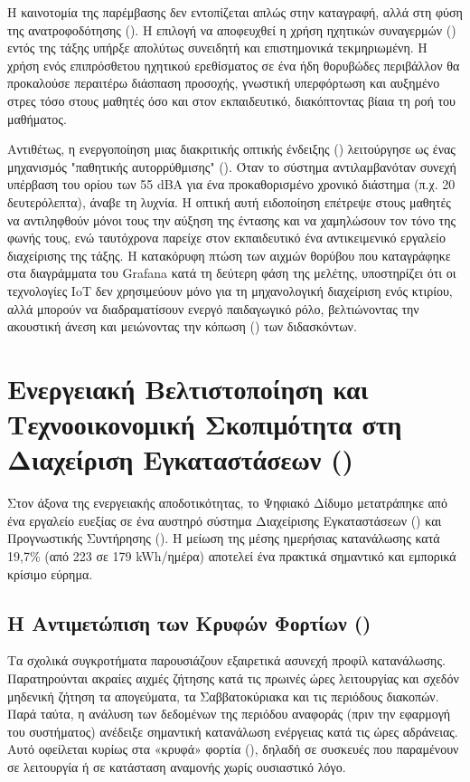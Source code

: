 Η καινοτομία της παρέμβασης δεν εντοπίζεται απλώς στην καταγραφή, αλλά στη φύση της ανατροφοδότησης (). Η επιλογή να αποφευχθεί η χρήση ηχητικών συναγερμών () εντός της τάξης υπήρξε απολύτως συνειδητή και επιστημονικά τεκμηριωμένη. Η χρήση ενός επιπρόσθετου ηχητικού ερεθίσματος σε ένα ήδη θορυβώδες περιβάλλον θα προκαλούσε περαιτέρω διάσπαση προσοχής, γνωστική υπερφόρτωση και αυξημένο στρες τόσο στους μαθητές όσο και στον εκπαιδευτικό, διακόπτοντας βίαια τη ροή του μαθήματος.

Αντιθέτως, η ενεργοποίηση μιας διακριτικής οπτικής ένδειξης () λειτούργησε ως ένας μηχανισμός "παθητικής αυτορρύθμισης" (). Όταν το σύστημα αντιλαμβανόταν συνεχή υπέρβαση του ορίου των 55 dBA για ένα προκαθορισμένο χρονικό διάστημα (π.χ. 20 δευτερόλεπτα), άναβε τη λυχνία. Η οπτική αυτή ειδοποίηση επέτρεψε στους μαθητές να αντιληφθούν μόνοι τους την αύξηση της έντασης και να χαμηλώσουν τον τόνο της φωνής τους, ενώ ταυτόχρονα παρείχε στον εκπαιδευτικό ένα αντικειμενικό εργαλείο διαχείρισης της τάξης. Η κατακόρυφη πτώση των αιχμών θορύβου που καταγράφηκε στα διαγράμματα του Grafana κατά τη δεύτερη φάση της μελέτης, υποστηρίζει ότι οι τεχνολογίες IoT δεν χρησιμεύουν μόνο για τη μηχανολογική διαχείριση ενός κτιρίου, αλλά μπορούν να διαδραματίσουν ενεργό παιδαγωγικό ρόλο, βελτιώνοντας την ακουστική άνεση και μειώνοντας την κόπωση () των διδασκόντων.

\section{Ενεργειακή Βελτιστοποίηση και Τεχνοοικονομική Σκοπιμότητα στη Διαχείριση Εγκαταστάσεων ()}
Στον άξονα της ενεργειακής αποδοτικότητας, το Ψηφιακό Δίδυμο μετατράπηκε από ένα εργαλείο ευεξίας σε ένα αυστηρό σύστημα Διαχείρισης Εγκαταστάσεων () και Προγνωστικής Συντήρησης (). Η μείωση της μέσης ημερήσιας κατανάλωσης κατά 19,7\% (από 223 σε 179 kWh/ημέρα) αποτελεί ένα πρακτικά σημαντικό και εμπορικά κρίσιμο εύρημα.

\subsection{Η Αντιμετώπιση των Κρυφών Φορτίων ()}
Τα σχολικά συγκροτήματα παρουσιάζουν εξαιρετικά ασυνεχή προφίλ κατανάλωσης. Παρατηρούνται ακραίες αιχμές ζήτησης κατά τις πρωινές ώρες λειτουργίας και σχεδόν μηδενική ζήτηση τα απογεύματα, τα Σαββατοκύριακα και τις περιόδους διακοπών. Παρά ταύτα, η ανάλυση των δεδομένων της περιόδου αναφοράς (πριν την εφαρμογή του συστήματος) ανέδειξε σημαντική κατανάλωση ενέργειας κατά τις ώρες αδράνειας. Αυτό οφείλεται κυρίως στα «κρυφά» φορτία (), δηλαδή σε συσκευές που παραμένουν σε λειτουργία ή σε κατάσταση αναμονής χωρίς ουσιαστικό λόγο.

